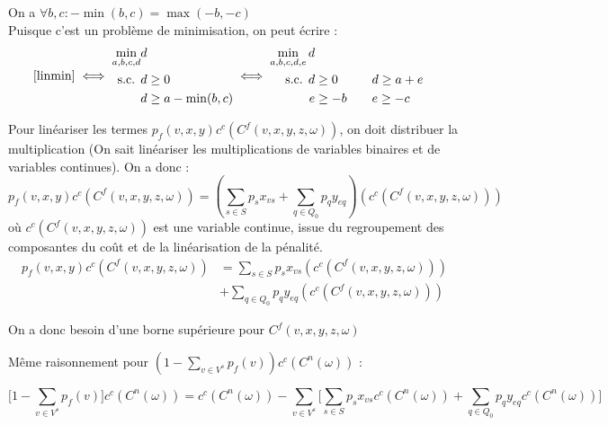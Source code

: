 \documentclass[a4paper,12pt]{article}
\begin{document}
    On a $ \forall b, c : -\min(b, c) = \max(-b, -c) $ \\
    Puisque c'est un problème de minimisation, on peut écrire :
    \begin{equation}
        \eqref{linmin} \iff
        \begin{aligned}
            \min _{a, b, c, d} & d \\
            \text{ s.c. } & d \geq 0 \\
            & d \geq a - \min(b, c) \\
        \end{aligned}
        \iff
        \begin{aligned}
            \min _{a, b, c, d, e} d \\
            \text{ s.c. }
            d &\geq 0 & \quad& d \geq a + e \\
            e &\geq -b & \quad& e \geq -c \\   
        \end{aligned}
    \end{equation}
    

    Pour linéariser les termes $p_f(v, x, y) c^c(C^f(v, x, y, z ,\omega))$, on doit distribuer la multiplication
    (On sait linéariser les multiplications de variables binaires et de variables continues). On a donc :
    $$ p_f(v, x, y) c^c(C^f(v, x, y, z ,\omega)) = (\sum _ {s \in S} p_s x_{vs} + \sum _{q \in Q_0} p_q y _{eq}) (c^c(C^f(v, x, y, z ,\omega)))  $$
    où $c^c(C^f(v, x, y, z ,\omega))$ est une variable continue, issue du regroupement des composantes du coût et de la linéarisation de la pénalité.
    $$
    \begin{aligned}
        p_f(v, x, y) c^c(C^f(v, x, y, z ,\omega)) &= \sum _ {s \in S} p_s x_{vs} (c^c(C^f(v, x, y, z ,\omega))) \\
        &+ \sum _{q \in Q_0} p_q y _{eq} (c^c(C^f(v, x, y, z ,\omega)))
    \end{aligned}
    $$

    On a donc besoin d'une borne supérieure pour $C^f(v, x, y, z ,\omega)$

    Même raisonnement pour $(1 - \sum _{v \in V^s} p_f(v)) c^c(C^n(\omega))$ :

    $$ \lbrack 1 - \sum _{v \in V^s} p_f(v) \rbrack c^c(C^n(\omega)) = 
    c^c(C^n(\omega)) - \sum _{v \in V^s} \lbrack \sum _{s \in S} p_s x_{vs} c^c(C^n(\omega)) + \sum _{q \in Q_0} p_q y _{eq} c^c(C^n(\omega)) \rbrack  $$
\end{document}
